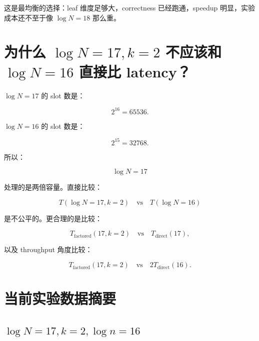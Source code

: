 \documentclass[UTF8,11pt,a4paper]{ctexart}
\begin{document}
这是最均衡的选择：leaf 维度足够大，correctness 已经跑通，speedup 明显，实验成本还不至于像 $\log N=18$ 那么重。

\section{为什么 $\log N=17,k=2$ 不应该和 $\log N=16$ 直接比 latency？}

$\log N=17$ 的 slot 数是：

\[
2^{16}=65536.
\]

$\log N=16$ 的 slot 数是：

\[
2^{15}=32768.
\]

所以：

\[
\log N=17
\]

处理的是两倍容量。直接比较：

\[
T(\log N=17,k=2)
\quad\text{vs}\quad
T(\log N=16)
\]

是不公平的。更合理的是比较：

\[
T_{\mathrm{factored}}(17,k=2)
\quad\text{vs}\quad
T_{\mathrm{direct}}(17),
\]

以及 throughput 角度比较：

\[
T_{\mathrm{factored}}(17,k=2)
\quad\text{vs}\quad
2T_{\mathrm{direct}}(16).
\]

\section{当前实验数据摘要}

\subsection{$\log N=17,k=2,\log n=16$}
\end{document}
